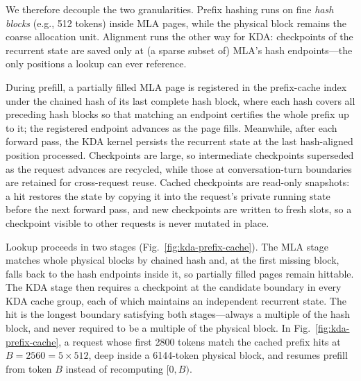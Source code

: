We therefore decouple the two granularities. Prefix hashing runs on
fine \emph{hash blocks} (e.g., 512 tokens) inside MLA pages, while the
physical block remains the coarse allocation unit. Alignment runs the
other way for KDA: checkpoints of the recurrent state are saved only
at (a sparse subset of) MLA's hash endpoints---the only positions a
lookup can ever reference.

During prefill, a partially filled MLA page is registered in the
prefix-cache index under the chained hash of its last complete hash
block, where each hash covers all preceding hash blocks so that
matching an endpoint certifies the whole prefix up to it; the
registered endpoint advances as the page fills. Meanwhile, after each
forward pass, the KDA kernel persists the recurrent state at the last
hash-aligned position processed. Checkpoints are large, so
intermediate checkpoints superseded as the request advances are
recycled, while those at conversation-turn boundaries are retained for
cross-request reuse. Cached checkpoints are read-only snapshots: a hit
restores the state by copying it into the request's private running
state before the next forward pass, and new checkpoints are written to
fresh slots, so a checkpoint visible to other requests is never
mutated in place.



Lookup proceeds in two stages (Fig.~\ref{fig:kda-prefix-cache}). The
MLA stage matches whole physical blocks by chained hash and, at the
first missing block, falls back to the hash endpoints inside it, so
partially filled pages remain hittable. The KDA stage then requires a
checkpoint at the candidate boundary in every KDA cache group, each of
which maintains an independent recurrent state. The hit is the longest
boundary satisfying both stages---always a multiple of the hash block,
and never required to be a multiple of the physical block. In
Fig.~\ref{fig:kda-prefix-cache}, a request whose first 2800 tokens
match the cached prefix hits at $B=2560=5\times512$, deep inside a
6144-token physical block, and resumes prefill from token $B$ instead
of recomputing $[0,B)$.


